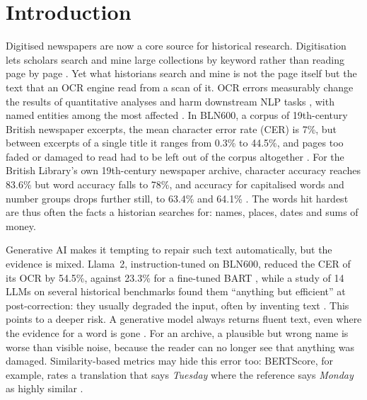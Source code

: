\section{Introduction}

Digitised newspapers are now a core source for historical research. Digitisation lets scholars search and mine
large collections by keyword rather than reading page by page \citep{nguyen2021survey}. Yet what historians search
and mine is not the page itself but the text that an OCR engine read from a scan of it. OCR errors measurably change
the results of quantitative analyses \citep{hill2019quantifying} and harm downstream NLP tasks
\citep{vanstrien2020assessing}, with named entities among the most affected \citep{hamdi2023indepth}. In BLN600, a
corpus of 19th-century British newspaper excerpts, the mean character error rate (CER) is 7\%, but between excerpts
of a single title it ranges from 0.3\% to 44.5\%, and pages too faded or damaged to read had to be left out of the
corpus altogether \citep{booth-etal-2024-bln600}. For the British Library's own 19th-century newspaper archive,
character accuracy reaches 83.6\% but word accuracy falls to 78\%, and accuracy for capitalised words and number
groups drops further still, to 63.4\% and 64.1\% \citep{tanner2009measuring}. The words hit hardest are thus often
the facts a historian searches for: names, places, dates and sums of money.

Generative AI makes it tempting to repair such text automatically, but the evidence is mixed. Llama~2,
instruction-tuned on BLN600, reduced the CER of its OCR by 54.5\%, against 23.3\% for a fine-tuned BART
\citep{thomas2024leveraging}, while a study of 14 LLMs on several historical benchmarks found them ``anything but
efficient'' at post-correction: they usually degraded the input, often by inventing text
\citep{boros2024postcorrection}. This points to a deeper risk. A generative model always returns fluent text, even
where the evidence for a word is gone \citep{ji2023survey}. For an archive, a plausible but wrong name is worse than
visible noise, because the reader can no longer see that anything was damaged. Similarity-based metrics may hide
this error too: BERTScore, for example, rates a translation that says \emph{Tuesday} where the reference says
\emph{Monday} as highly similar \citep{zhang2020bertscore}.

